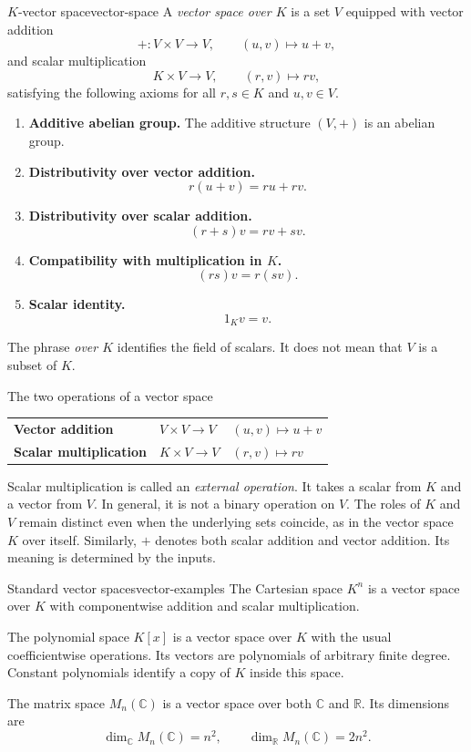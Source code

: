 \documentclass[10pt,a4paper]{article}
\newcommand{\R}{\mathbb{R}}
\newcommand{\C}{\mathbb{C}}
\begin{document}
\begin{definition}{$K$-vector space}{vector-space}
A \emph{vector space over $K$} is a set $V$ equipped with vector addition
\[
  +:V\times V\longrightarrow V,
  \qquad
  (u,v)\longmapsto u+v,
\]
and scalar multiplication
\[
  K\times V\longrightarrow V,
  \qquad
  (r,v)\longmapsto rv,
\]
satisfying the following axioms for all $r,s\in K$ and $u,v\in V$.
\begin{enumerate}[label=\textup{(V\arabic*)}]
  \item \textbf{Additive abelian group.} The additive structure $(V,+)$ is
  an abelian group.

  \item \textbf{Distributivity over vector addition.}
  \[
    r(u+v)=ru+rv.
  \]

  \item \textbf{Distributivity over scalar addition.}
  \[
    (r+s)v=rv+sv.
  \]

  \item \textbf{Compatibility with multiplication in $K$.}
  \[
    (rs)v=r(sv).
  \]

  \item \textbf{Scalar identity.}
  \[
    1_Kv=v.
  \]
\end{enumerate}
\end{definition}

The phrase \emph{over $K$} identifies the field of scalars. It does not mean
that $V$ is a subset of $K$.

\begin{summarybox}{The two operations of a vector space}
\renewcommand{\arraystretch}{1.25}
\begin{tabularx}{\linewidth}{>{\bfseries}p{4.2cm}p{4.2cm}X}
Vector addition & $V\times V\to V$ & $(u,v)\mapsto u+v$\\
Scalar multiplication & $K\times V\to V$ & $(r,v)\mapsto rv$
\end{tabularx}
\end{summarybox}

Scalar multiplication is called an \emph{external operation}. It takes a
scalar from $K$ and a vector from $V$. In general, it is not a binary operation
on $V$. The roles of $K$ and $V$ remain distinct even when the underlying sets
coincide, as in the vector space $K$ over itself. Similarly, $+$ denotes both
scalar addition and vector addition. Its meaning is determined by the inputs.

\begin{examplebox}{Standard vector spaces}{vector-examples}
The Cartesian space $K^n$ is a vector space over $K$ with componentwise
addition and scalar multiplication.

The polynomial space $K[x]$ is a vector space over $K$ with the usual
coefficientwise operations. Its vectors are polynomials of arbitrary finite
degree. Constant polynomials identify a copy of $K$ inside this space.

The matrix space $M_n(\C)$ is a vector space over both $\C$ and $\R$. Its
dimensions are
\[
  \dim_{\C}M_n(\C)=n^2,
  \qquad
  \dim_{\R}M_n(\C)=2n^2.
\]
\end{examplebox}
\end{document}

